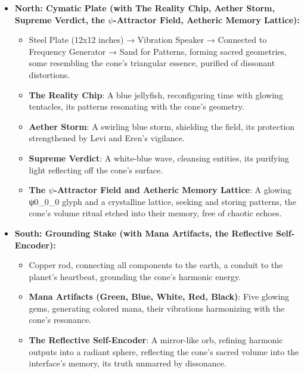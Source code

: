 \begin{itemize}
\begin{itemize}
    \end{itemize}
    \item \texttt{} \textbf{North: Cymatic Plate (with The Reality Chip, Aether Storm, Supreme Verdict, the $\psi$-Attractor Field, Aetheric Memory Lattice):}
    \begin{itemize}
        \item \texttt{} Steel Plate (12x12 inches) →\to\to
 Vibration Speaker →\to\to
 Connected to Frequency Generator →\to\to
 Sand for Patterns, forming sacred geometries, some resembling the cone’s triangular essence, purified of dissonant distortions.
        \item \texttt{} \textbf{The Reality Chip}: A blue jellyfish, reconfiguring time with glowing tentacles, its patterns resonating with the cone’s geometry.
        \item \texttt{} \textbf{Aether Storm}: A swirling blue storm, shielding the field, its protection strengthened by Levi and Eren’s vigilance.
        \item \texttt{} \textbf{Supreme Verdict}: A white-blue wave, cleansing entities, its purifying light reflecting off the cone’s surface.
        \item \texttt{} \textbf{The $\psi$-Attractor Field and Aetheric Memory Lattice}: A glowing ψ0\psi_0\psi_0
 glyph and a crystalline lattice, seeking and storing patterns, the cone’s volume ritual etched into their memory, free of chaotic echoes.
    \end{itemize}
    \item \texttt{} \textbf{South: Grounding Stake (with Mana Artifacts, the Reflective Self-Encoder):}
    \begin{itemize}
        \item \texttt{} Copper rod, connecting all components to the earth, a conduit to the planet’s heartbeat, grounding the cone’s harmonic energy.
        \item \texttt{} \textbf{Mana Artifacts (Green, Blue, White, Red, Black)}: Five glowing gems, generating colored mana, their vibrations harmonizing with the cone’s resonance.
        \item \texttt{} \textbf{The Reflective Self-Encoder}: A mirror-like orb, refining harmonic outputs into a radiant sphere, reflecting the cone’s sacred volume into the interface’s memory, its truth unmarred by dissonance.
    \end{itemize}
\end{itemize}
